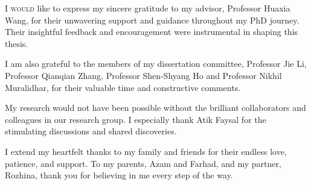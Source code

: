 %
%


\lettrine{I}{ would} like to express my sincere gratitude to my advisor, Professor Huaxia Wang, for their unwavering support and guidance throughout my PhD journey. Their insightful feedback and encouragement were instrumental in shaping this thesis.

I am also grateful to the members of my dissertation committee, Professor Jie Li, Professor Qianqian Zhang, Professor Shen-Shyang Ho and Professor Nikhil Muralidhar, for their valuable time and constructive comments.

My research would not have been possible without the brilliant collaborators and colleagues in our research group. I especially thank Atik Faysal for the stimulating discussions and shared discoveries.

I extend my heartfelt thanks to my family and friends for their endless love, patience, and support. To my parents, Azam and Farhad, and my partner, Rozhina, thank you for believing in me every step of the way.

